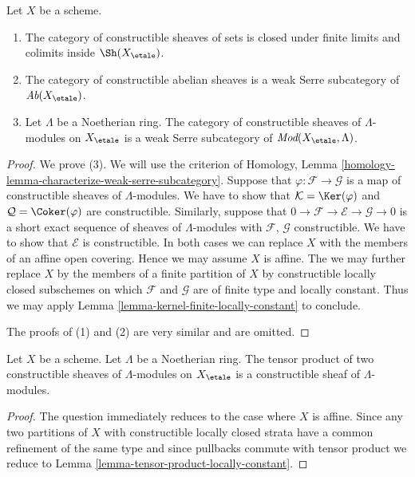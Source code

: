 \begin{lemma}
\label{lemma-constructible-abelian}
Let $X$ be a scheme.
\begin{enumerate}
\item The category of constructible sheaves of sets
is closed under finite limits and colimits inside $\Sh(X_\etale)$.
\item The category of constructible abelian sheaves is a
weak Serre subcategory of $\textit{Ab}(X_\etale)$.
\item Let $\Lambda$ be a Noetherian ring. The category of
constructible sheaves of $\Lambda$-modules on
$X_\etale$ is a weak Serre subcategory of
$\textit{Mod}(X_\etale, \Lambda)$.
\end{enumerate}
\end{lemma}

\begin{proof}
We prove (3). We will use the criterion of
Homology, Lemma \ref{homology-lemma-characterize-weak-serre-subcategory}.
Suppose that $\varphi : \mathcal{F} \to \mathcal{G}$
is a map of constructible sheaves of $\Lambda$-modules.
We have to show that $\mathcal{K} = \Ker(\varphi)$ and
$\mathcal{Q} = \Coker(\varphi)$ are constructible. 
Similarly, suppose that
$0 \to \mathcal{F} \to \mathcal{E} \to \mathcal{G} \to 0$
is a short exact sequence of sheaves of $\Lambda$-modules
with $\mathcal{F}$, $\mathcal{G}$ constructible. We have to show
that $\mathcal{E}$ is constructible.
In both cases we can replace $X$ with the members of an
affine open covering. Hence we may assume $X$ is affine.
The we may further replace $X$ by the members of a finite
partition of $X$ by constructible locally closed subschemes
on which $\mathcal{F}$ and $\mathcal{G}$ are of finite type and
locally constant. Thus we may apply
Lemma \ref{lemma-kernel-finite-locally-constant} to conclude.

\medskip\noindent
The proofs of (1) and (2) are very similar and are omitted.
\end{proof}

\begin{lemma}
\label{lemma-tensor-product-constructible}
Let $X$ be a scheme. Let $\Lambda$ be a Noetherian ring.
The tensor product of two constructible sheaves of $\Lambda$-modules
on $X_\etale$ is a constructible sheaf of $\Lambda$-modules.
\end{lemma}

\begin{proof}
The question immediately reduces to the case where $X$ is affine.
Since any two partitions of $X$ with constructible locally
closed strata have a common refinement of the same type and
since pullbacks commute with tensor product we reduce to
Lemma \ref{lemma-tensor-product-locally-constant}.
\end{proof}

